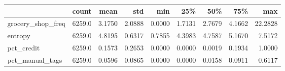 \begin{tabular}{lrrrrrrrr}
\toprule
{} &   count &    mean &     std &     min &     25\% &     50\% &     75\% &      max \\
\midrule
grocery\_shop\_freq &  6259.0 &  3.1750 &  2.0888 &  0.0000 &  1.7131 &  2.7679 &  4.1662 &  22.2828 \\
entropy           &  6259.0 &  4.8195 &  0.6317 &  0.7855 &  4.3983 &  4.7587 &  5.1670 &   7.5172 \\
pct\_credit        &  6259.0 &  0.1573 &  0.2653 &  0.0000 &  0.0000 &  0.0019 &  0.1934 &   1.0000 \\
pct\_manual\_tags   &  6259.0 &  0.0596 &  0.0865 &  0.0000 &  0.0000 &  0.0158 &  0.0911 &   0.6117 \\
\bottomrule
\end{tabular}
